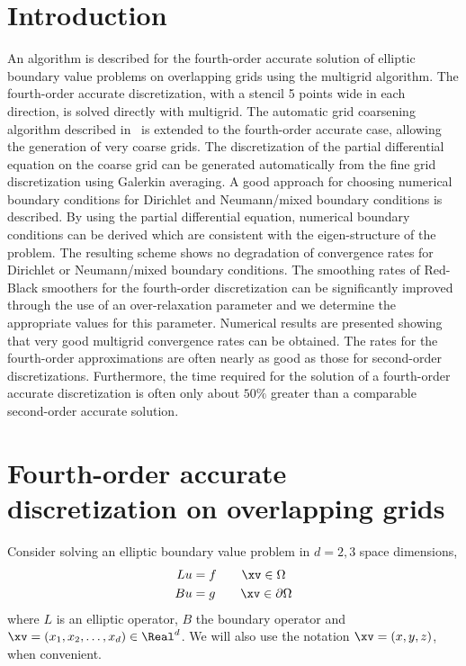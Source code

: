 \documentclass{article}
\begin{document}
\begin{flushleft}
\end{flushleft}

\vfill\eject
\tableofcontents



\vfill\eject
\section{Introduction}


  An algorithm is described for the fourth-order accurate solution of elliptic boundary
value problems on overlapping grids using the multigrid algorithm. The
fourth-order accurate discretization, with a stencil 5 points wide in each
direction, is solved directly with multigrid. The automatic grid coarsening algorithm
described in~\cite{OnMultigrid} is extended to the fourth-order accurate case, allowing the
generation of very coarse grids.
%
The discretization of the partial differential equation on the
coarse grid can be generated automatically from the fine grid discretization
using Galerkin averaging.
%
A good approach for choosing numerical boundary conditions for Dirichlet and Neumann/mixed
boundary conditions is described. By using the partial differential equation, 
numerical boundary conditions
can be derived which are consistent with the eigen-structure of the problem.
The resulting scheme shows no degradation of convergence rates for Dirichlet or Neumann/mixed
boundary conditions.
%
The smoothing rates of Red-Black smoothers for the fourth-order discretization
can be significantly improved through
the use of an over-relaxation parameter and we determine the appropriate values
for this parameter.
%
Numerical results are presented showing that very good multigrid convergence rates can be obtained. 
The rates for the fourth-order approximations are often nearly as
good as those for second-order discretizations. 
Furthermore, the time required for the solution of a fourth-order accurate discretization 
is often only about $50\%$ greater than a comparable second-order accurate solution.

\section{Fourth-order accurate discretization on overlapping grids}

Consider solving an elliptic boundary value problem in $d=2,3$ space dimensions,
\begin{align*}
  L u & = f \qquad \xv\in\Omega \\
  B u & = g \qquad \xv\in\partial\Omega
\end{align*}
where $L$ is an elliptic operator, $B$ the boundary operator and $\xv=(x_1,x_2,\ldots,x_d)\in \Real^d$.
We will also use the notation $\xv=(x,y,z)$, when convenient.
\end{document}
